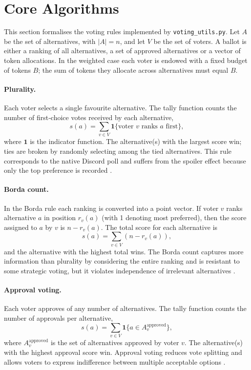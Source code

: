 \section{Core Algorithms}
\label{sec:algorithms}

This section formalises the voting rules implemented by
\texttt{voting\_utils.py}.  Let $A$ be the set of alternatives, with
\(|A|=n\), and let $V$ be the set of voters.  A ballot is either a
ranking of all alternatives, a set of approved alternatives or a
vector of token allocations.  In the weighted case each voter is
endowed with a fixed budget of tokens $B$; the sum of tokens they
allocate across alternatives must equal $B$.

\paragraph{Plurality.}  Each voter selects a single favourite
alternative.  The tally function counts the number of first‑choice
votes received by each alternative,
\begin{equation}
    s(a) = \sum_{v \in V} \mathbf{1}\{\text{voter }v\text{ ranks }a\text{ first}\},
\end{equation}
where $\mathbf{1}$ is the indicator function.  The alternative(s)
with the largest score win; ties are broken by randomly selecting
among the tied alternatives.  This rule corresponds to the native
Discord poll and suffers from the spoiler effect because only the
top preference is recorded \cite{Black1958}.

\paragraph{Borda count.}  In the Borda rule each ranking is converted
into a point vector.  If voter $v$ ranks alternative $a$ in
position $r_{v}(a)$ (with 1 denoting most preferred), then the
score assigned to $a$ by $v$ is $n - r_{v}(a)$.  The total
score for each alternative is
\begin{equation}
    s(a) = \sum_{v \in V} (n - r_{v}(a)),
\end{equation}
and the alternative with the highest total wins.  The Borda count
captures more information than plurality by considering the entire
ranking and is resistant to some strategic voting, but it violates
independence of irrelevant alternatives \cite{Borda1784}.

\paragraph{Approval voting.}  Each voter approves of any number of
alternatives.  The tally function counts the number of approvals per
alternative,
\begin{equation}
    s(a) = \sum_{v \in V} \mathbf{1}\{a \in A_{v}^{\text{approved}}\},
\end{equation}
where $A_{v}^{\text{approved}}$ is the set of alternatives
approved by voter $v$.  The alternative(s) with the highest approval
score win.  Approval voting reduces vote splitting and allows voters
to express indifference between multiple acceptable options
\cite{Black1958}.

